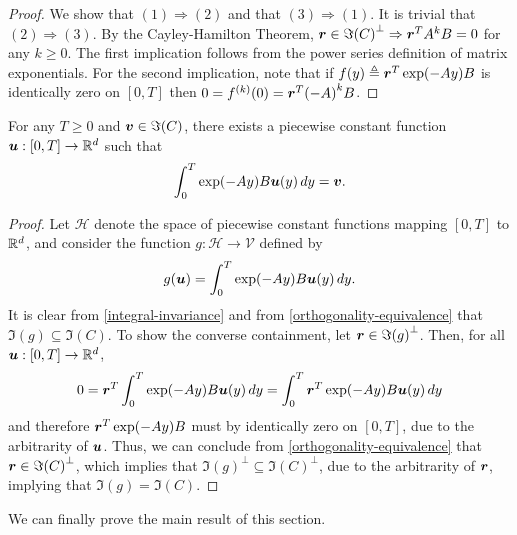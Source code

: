 \begin{proof}
We show that $(1) \Rightarrow (2)$ and that $(3) \Rightarrow (1)$. It is trivial that $(2) \Rightarrow (3)$.
By the Cayley-Hamilton Theorem, $\boldsymbol{r} \in \Im{(C)}^{\perp} \Rightarrow \boldsymbol{r}^{T} A^{k} B = 0$ for any $k \geq 0$. The first implication follows from the power series definition of matrix exponentials. For the second implication, note that if $f(y) \triangleq \boldsymbol{r}^{T} \exp(-Ay) B$ is identically zero on $[0,T]$ then $0 = f^{(k)} (0) = \boldsymbol{r}^{T} {(-A)}^{k} B$.
\end{proof}

\begin{proposition}
For any $T \geq 0$ and $\boldsymbol{v} \in \Im(C)$, there exists a piecewise constant function $\boldsymbol{u} : [0, T] \rightarrow \mathbb{R}^{d}$ such that
\begin{equation}
\label{control-existence}
\int_{0}^{T} \exp(-Ay) B \myvector{u}(y) \, dy = \myvector{v}.
\end{equation}
\end{proposition}

\begin{proof}
Let $\mathcal{H}$ denote the space of piecewise constant functions mapping $[0,T]$ to $\mathbb{R}^{d}$, and consider the function $g : \mathcal{H} \rightarrow \mathcal{V}$ defined by
\begin{equation*}
g(\boldsymbol{u}) = \int_{0}^{T} \exp(-Ay) B \boldsymbol{u}(y) \, dy.
\end{equation*}
It is clear from \cref{integral-invariance} and from \cref{orthogonality-equivalence} that $\Im(g) \subseteq \Im(C)$. To show the converse containment, let $\boldsymbol{r} \in \Im{(g)}^{\perp}$. Then, for all $\boldsymbol{u} : [0,T] \rightarrow \mathbb{R}^{d}$,
\begin{equation*}
0 = \boldsymbol{r}^{T} \int_{0}^{T} \exp(-Ay) B \boldsymbol{u}(y) \, dy = \int_{0}^{T} \boldsymbol{r}^{T} \exp(-Ay) B \boldsymbol{u}(y) \, dy
\end{equation*}
and therefore $\boldsymbol{r}^{T} \exp(-Ay) B$ must by identically zero on $[0,T]$, due to the arbitrarity of $\boldsymbol{u}$. Thus, we can conclude from \cref{orthogonality-equivalence} that $\boldsymbol{r} \in \Im{(C)}^{\perp}$, which implies that $\Im{(g)}^{\perp} \subseteq \Im{(C)}^{\perp}$, due to the arbitrarity of $\boldsymbol{r}$, implying that $\Im(g) = \Im(C)$.
\end{proof}

We can finally prove the main result of this section.

